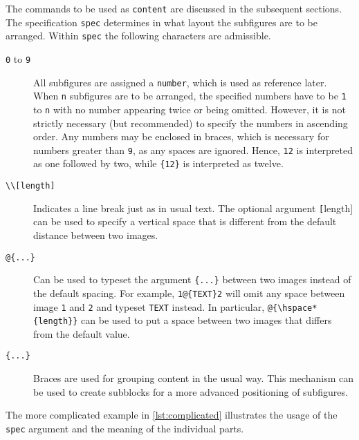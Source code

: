 \documentclass[version=3.12,american]{scrartcl}
\begin{document}
The commands to be used as \texttt{content} are discussed in the subsequent sections. The specification \texttt{spec} determines in what layout the subfigures are to be arranged. Within \texttt{spec} the following characters are admissible.

\begin{description}
\item[\texttt{0} to \texttt{9}\enskip] All subfigures are assigned a \texttt{number}, which is used as reference later. When \texttt{n} subfigures are to be arranged, the specified numbers have to be \texttt{1} to \texttt{n} with no number appearing twice or being omitted. However, it is not strictly necessary (but recommended) to specify the numbers in ascending order. Any numbers may be enclosed in braces, which is necessary for numbers greater than \texttt{9}, as any spaces are ignored. Hence, \texttt{12} is interpreted as one followed by two, while \verb|{12}| is interpreted as twelve.

\item[\texttt{\textbackslash\textbackslash[length]}\enskip] Indicates a line break just as in usual text. The optional argument \texttt[length] can be used to specify a vertical space that is different from the default distance between two images.

\item[\texttt{@\{...\}}\enskip] Can be used to typeset the argument \verb|{...}| between two images instead of the default spacing. For example, \verb|1@{TEXT}2| will omit any space between image \texttt{1} and \texttt{2} and typeset \texttt{TEXT} instead. In particular, \verb|@{\hspace*{length}}| can be used to put a space between two images that differs from the default value.

\item[\texttt{\{...\}}\enskip] Braces are used for grouping content in the usual way. This mechanism can be used to create subblocks for a more advanced positioning of subfigures.
\end{description}

The more complicated example in \cref{lst:complicated} illustrates the usage of the \texttt{spec} argument and the meaning of the individual parts.
\end{document}
